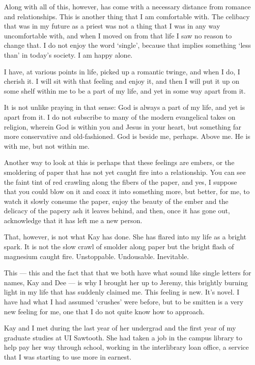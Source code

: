 Along with all of this, however, has come with a necessary distance from romance and relationships. This is another thing that I am comfortable with. The celibacy that was in my future as a priest was not a thing that I was in any way uncomfortable with, and when I moved on from that life I saw no reason to change that. I do not enjoy the word `single', because that implies something `less than' in today's society. I am happy alone.

I have, at various points in life, picked up a romantic twinge, and when I do, I cherish it. I will sit with that feeling and enjoy it, and then I will put it up on some shelf within me to be a part of my life, and yet in some way apart from it.

It is not unlike praying in that sense: God is always a part of my life, and yet is apart from it. I do not subscribe to many of the modern evangelical takes on religion, wherein God is within you and Jesus in your heart, but something far more conservative and old-fashioned. God is beside me, perhaps. Above me. He is with me, but not within me.

Another way to look at this is perhaps that these feelings are embers, or the smoldering of paper that has not yet caught fire into a relationship. You can see the faint tint of red crawling along the fibers of the paper, and yes, I suppose that you could blow on it and coax it into something more, but better, for me, to watch it slowly consume the paper, enjoy the beauty of the ember and the delicacy of the papery ash it leaves behind, and then, once it has gone out, acknowledge that it has left me a new person.

That, however, is not what Kay has done. She has flared into my life as a bright spark. It is not the slow crawl of smolder along paper but the bright flash of magnesium caught fire. Unstoppable. Undousable. Inevitable.

This --- this and the fact that that we both have what sound like single letters for names, Kay and Dee --- is why I brought her up to Jeremy, this brightly burning light in my life that has suddenly claimed me. This feeling is new. It's novel. I have had what I had assumed `crushes' were before, but to be smitten is a very new feeling for me, one that I do not quite know how to approach.

Kay and I met during the last year of her undergrad and the first year of my graduate studies at UI Sawtooth. She had taken a job in the campus library to help pay her way through school, working in the interlibrary loan office, a service that I was starting to use more in earnest.

